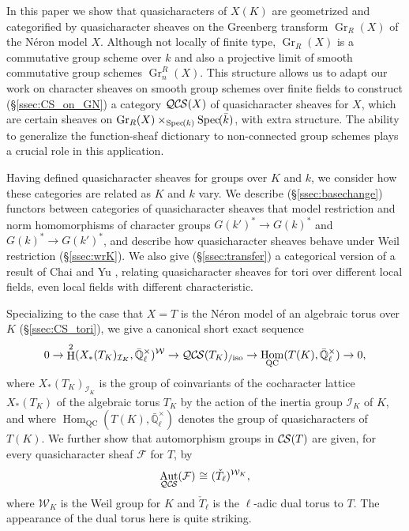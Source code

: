 \documentclass[10pt]{amsart}
\theoremstyle{plain}
\theoremstyle{definition}
\theoremstyle{remark}
\newcommand{\EE}{\mathbb{\bar Q}_\ell}
\newcommand{\bFq}{\bar{k}}
\newcommand{\Fq}{k}
\newcommand{\EEx}{\EE^\times}
\newcommand{\Weil}[1]{\mathcal{W}_{#1}}
\DeclareMathOperator{\Aut}{Aut}
\DeclareMathOperator{\Hom}{Hom}
\DeclareMathOperator{\Gr}{Gr}
\DeclareMathOperator{\Hh}{H}
\newcommand{\Spec}[1]{{\operatorname{Spec}\hskip-1pt( #1 )}}
\newcommand{\iso}{{\ \cong\ }}
\newcommand{\cs}[1]{{\mathcal{#1}}}
\newcommand{\CS}{{\mathcal{C\hskip-0.8pt S}}}
\newcommand{\QCS}{{\mathcal{QC\hskip-0.8pt S}}}
\newcommand{\QCSiso}[1]{\QCS(#1)_{/\text{iso}}}
\begin{document}
In this paper we show that quasicharacters of $X(K)$ are geometrized and categorified by quasicharacter sheaves on the
Greenberg transform $\Gr_R(X)$ of the N\'eron model $X$.
Although not locally of finite type, $\Gr_R(X)$ is a commutative group scheme over $\Fq$ and also a projective limit of smooth commutative group schemes $\Gr^R_n(X)$.
This structure allows us to adapt our work on character sheaves on smooth group schemes over finite fields to construct (\S\ref{ssec:CS_on_GN}) a category $\QCS(X)$
of quasicharacter sheaves for $X$, which are certain sheaves on $\Gr_R(X)\times_{\Spec{\Fq}} \Spec{\bFq}$, with extra structure.
The ability to generalize the function-sheaf dictionary to non-connected group schemes plays a crucial role in this application.

Having defined quasicharacter sheaves for groups over $K$ and $\Fq$, we consider how
these categories are related as $K$ and $\Fq$ vary.  We describe (\S\ref{ssec:basechange}) functors between categories
of quasicharacter sheaves that model restriction and norm homomorphisms of character groups $G(k')^* \to G(k)^*$ and $G(k)^* \to G(k')^*$,
and describe how quasicharacter sheaves behave under Weil restriction (\S\ref{ssec:wrK}).  We also give (\S\ref{ssec:transfer})
a categorical version of a result of Chai and Yu \cite{chai-yu:01a},
relating quasicharacter sheaves for tori over different local fields, even local fields
with different characteristic.

Specializing to the case that $X = T$ is the N\'eron model of an algebraic torus over $K$ (\S\ref{ssec:CS_tori}), 
we give a canonical short exact sequence 
\[
0 \to \Hh^2(X_*(T_K)_{\mathcal{I}_K},\EEx)^{\Weil{}} \to \QCSiso{T_K} \to \Hom_\text{QC}(T(K),\EEx) \to 0,
\]
where $X_*(T_K)_{\mathcal{I}_K}$ is the group of coinvariants of the cocharacter lattice $X_*(T_K)$ of the algebraic torus $T_K$ by the action of the inertia group $\mathcal{I}_K$ of $K$, and where $\Hom_\text{QC}(T(K),\EEx)$ denotes the group of quasicharacters of $T(K)$.
We further show that automorphism groups in $\CS(T)$ are given, for every quasicharacter sheaf $\cs{F}$ for $T$, by
\[
\Aut_{\QCS{}}(\cs{F}) \iso (\check{T}_\ell)^{\Weil{K}},
\]
where $\Weil{K}$ is the Weil group for $K$ and $\check{T}_\ell$ is the $\ell$-adic dual torus to $T$.
The appearance of the dual torus here is quite striking. 
\end{document}

